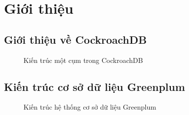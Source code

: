 \documentclass{report}
\begin{document}
\tableofcontents %

\chapter{Giới thiệu}

\section{Giới thiệu về CockroachDB}

\begin{figure}[h]
    \centering
    \caption{Kiến trúc một cụm trong CockroachDB}
    \label{fig:example1}
\end{figure}

\section{Kiến trúc cơ sở dữ liệu Greenplum}

\begin{figure}[h]
    \centering
    \caption{Kiến trúc hệ thống cơ sở dữ liệu Greenplum}
    \label{fig:example2}
\end{figure}

\listoffigures %
\end{document}
